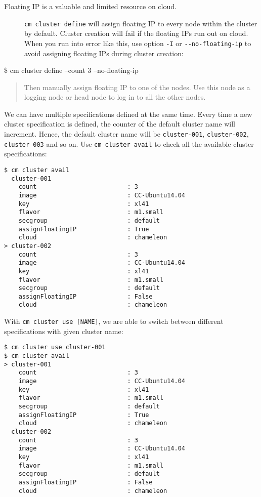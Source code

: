 \begin{description}
\item[Floating IP is a valuable and limited resource on cloud.]
\texttt{cm\ cluster\ define} will assign floating IP to every node
within the cluster by default. Cluster creation will fail if the
floating IPs run out on cloud. When you run into error like this, use
option \texttt{-I} or \texttt{-\/-no-floating-ip} to avoid assigning
floating IPs during cluster creation:
\end{description}

\$ cm cluster define --count 3 --no-floating-ip

\begin{quote}
Then manually assign floating IP to one of the nodes. Use this node as a
logging node or head node to log in to all the other nodes.
\end{quote}

We can have multiple specifications defined at the same time. Every time
a new cluster specification is defined, the counter of the default
cluster name will increment. Hence, the default cluster name will be
\texttt{cluster-001}, \texttt{cluster-002}, \texttt{cluster-003} and so
on. Use \texttt{cm\ cluster\ avail} to check all the available cluster
specifications:

\begin{verbatim}
$ cm cluster avail
  cluster-001
    count                         : 3
    image                         : CC-Ubuntu14.04
    key                           : xl41
    flavor                        : m1.small
    secgroup                      : default
    assignFloatingIP              : True
    cloud                         : chameleon
> cluster-002
    count                         : 3
    image                         : CC-Ubuntu14.04
    key                           : xl41
    flavor                        : m1.small
    secgroup                      : default
    assignFloatingIP              : False
    cloud                         : chameleon
\end{verbatim}

With \texttt{cm\ cluster\ use\ {[}NAME{]}}, we are able to switch
between different specifications with given cluster name:

\begin{verbatim}
$ cm cluster use cluster-001
$ cm cluster avail
> cluster-001
    count                         : 3
    image                         : CC-Ubuntu14.04
    key                           : xl41
    flavor                        : m1.small
    secgroup                      : default
    assignFloatingIP              : True
    cloud                         : chameleon
  cluster-002
    count                         : 3
    image                         : CC-Ubuntu14.04
    key                           : xl41
    flavor                        : m1.small
    secgroup                      : default
    assignFloatingIP              : False
    cloud                         : chameleon
\end{verbatim}

